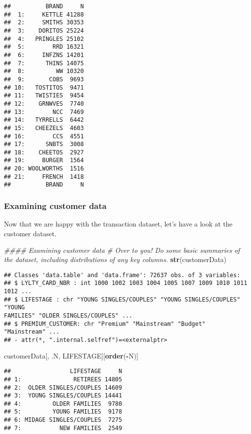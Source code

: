 \documentclass[]{article}
\newenvironment{Shaded}{\begin{snugshade}}{\end{snugshade}}
\newcommand{\CommentTok}[1]{\textcolor[rgb]{0.56,0.35,0.01}{\textit{#1}}}
\newcommand{\KeywordTok}[1]{\textcolor[rgb]{0.13,0.29,0.53}{\textbf{#1}}}
\newcommand{\NormalTok}[1]{#1}
\newcommand{\OperatorTok}[1]{\textcolor[rgb]{0.81,0.36,0.00}{\textbf{#1}}}
\begin{document}
\begin{verbatim}
##          BRAND     N
##  1:     KETTLE 41288
##  2:     SMITHS 30353
##  3:    DORITOS 25224
##  4:   PRINGLES 25102
##  5:        RRD 16321
##  6:     INFZNS 14201
##  7:      THINS 14075
##  8:         WW 10320
##  9:       COBS  9693
## 10:   TOSTITOS  9471
## 11:   TWISTIES  9454
## 12:    GRNWVES  7740
## 13:        NCC  7469
## 14:   TYRRELLS  6442
## 15:   CHEEZELS  4603
## 16:        CCS  4551
## 17:      SNBTS  3008
## 18:    CHEETOS  2927
## 19:     BURGER  1564
## 20: WOOLWORTHS  1516
## 21:     FRENCH  1418
##          BRAND     N
\end{verbatim}

\hypertarget{examining-customer-data}{%
\subsubsection{Examining customer data}\label{examining-customer-data}}

Now that we are happy with the transaction dataset, let's have a look at
the customer dataset.

\begin{Shaded}
\begin{Highlighting}[]
\CommentTok{#### Examining customer data}
\CommentTok{# Over to you! Do some basic summaries of the dataset, including distributions of any key columns.}
\KeywordTok{str}\NormalTok{(customerData)}
\end{Highlighting}
\end{Shaded}

\begin{verbatim}
## Classes 'data.table' and 'data.frame': 72637 obs. of 3 variables:
## $ LYLTY_CARD_NBR : int 1000 1002 1003 1004 1005 1007 1009 1010 1011 1012 ...
## $ LIFESTAGE : chr "YOUNG SINGLES/COUPLES" "YOUNG SINGLES/COUPLES" "YOUNG
FAMILIES" "OLDER SINGLES/COUPLES" ...
## $ PREMIUM_CUSTOMER: chr "Premium" "Mainstream" "Budget" "Mainstream" ...
## - attr(*, ".internal.selfref")=<externalptr>
\end{verbatim}

\begin{Shaded}
\begin{Highlighting}[]
\NormalTok{customerData[, .N, LIFESTAGE][}\KeywordTok{order}\NormalTok{(}\OperatorTok{-}\NormalTok{N)]}
\end{Highlighting}
\end{Shaded}

\begin{verbatim}
##                 LIFESTAGE     N
## 1:               RETIREES 14805
## 2:  OLDER SINGLES/COUPLES 14609
## 3:  YOUNG SINGLES/COUPLES 14441
## 4:         OLDER FAMILIES  9780
## 5:         YOUNG FAMILIES  9178
## 6: MIDAGE SINGLES/COUPLES  7275
## 7:           NEW FAMILIES  2549
\end{verbatim}
\end{document}
